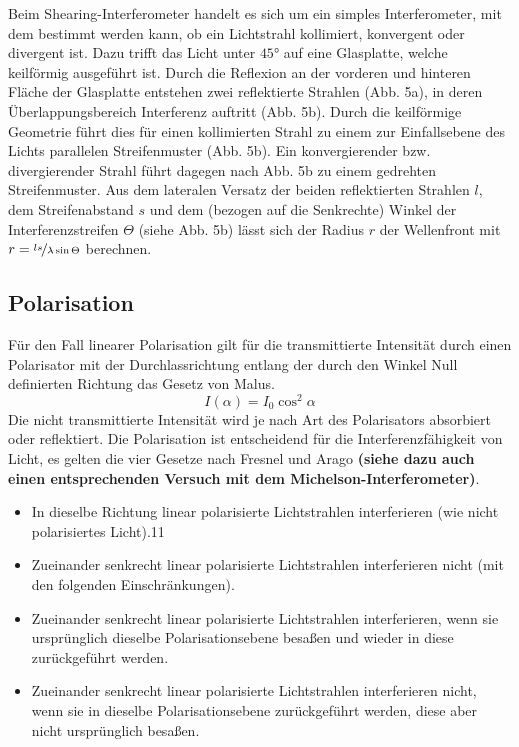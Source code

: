 \documentclass[ngerman]{scrartcl}
\begin{document}
Beim Shearing-Interferometer handelt es sich um ein simples Interferometer, mit dem bestimmt werden kann, ob ein Lichtstrahl kollimiert, konvergent oder divergent ist. Dazu trifft das Licht unter $45°$ auf eine Glasplatte, welche keilförmig ausgeführt ist. Durch die Reflexion an der vorderen und hinteren Fläche der Glasplatte entstehen zwei reflektierte Strahlen (Abb. 5a), in deren Überlappungsbereich Interferenz auftritt (Abb. 5b). Durch die keilförmige Geometrie führt dies für einen kollimierten Strahl zu einem zur Einfallsebene des Lichts parallelen Streifenmuster (Abb. 5b). Ein konvergierender bzw. divergierender Strahl führt dagegen nach Abb. 5b zu einem gedrehten Streifenmuster. Aus dem lateralen Versatz der beiden reflektierten Strahlen $l$, dem Streifenabstand $s$ und dem (bezogen auf die Senkrechte) Winkel der Interferenzstreifen $\Theta$ (siehe Abb. 5b) lässt sich der Radius $r$ der Wellenfront mit $r = \nicefrac{ls}{\lambda \sin \Theta}$ berechnen.
\subsection{Polarisation}
\label{sec:grundlagen_polarisation}
Für den Fall linearer Polarisation gilt für die transmittierte Intensität durch einen Polarisator mit der Durchlassrichtung entlang der durch den Winkel Null definierten Richtung das Gesetz von Malus.
\begin{equation}
    I(\alpha) = I_0 \cos^2 \alpha
\end{equation}
Die nicht transmittierte Intensität wird je nach Art des Polarisators absorbiert oder reflektiert. Die Polarisation ist entscheidend für die Interferenzfähigkeit von Licht, es gelten die vier Gesetze nach Fresnel und Arago \textbf{(siehe dazu auch einen entsprechenden Versuch mit dem Michelson-Interferometer)}.
\begin{itemize}
    \item In dieselbe Richtung linear polarisierte Lichtstrahlen interferieren (wie nicht polarisiertes Licht).11
    \item Zueinander senkrecht linear polarisierte Lichtstrahlen interferieren nicht (mit den folgenden Einschränkungen).
    \item Zueinander senkrecht linear polarisierte Lichtstrahlen interferieren, wenn sie ursprünglich dieselbe Polarisationsebene besaßen und wieder in diese zurückgeführt werden.
    \item  Zueinander senkrecht linear polarisierte Lichtstrahlen interferieren nicht, wenn sie in dieselbe Polarisationsebene zurückgeführt werden, diese aber nicht ursprünglich besaßen.
\end{itemize}
\end{document}
